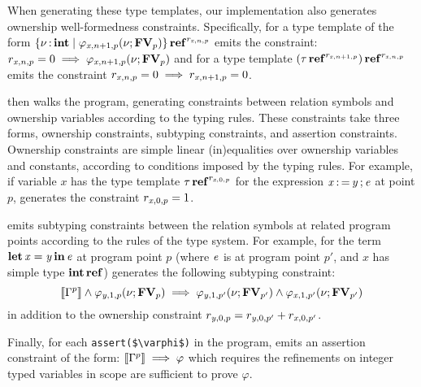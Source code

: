 When generating these type templates, our implementation
also generates ownership well-formedness constraints. Specifically,
for a type template of the form $  \left\{{  \nu  \operatorname{:} \mathbf{int} \mid    \varphi _{ \mathit{x} , n  +  1 , p }  ( \nu ;   \mathbf{FV} _{ p }  )  }\right\}   \operatorname{\mathbf{ref}}^{  r _{ \mathit{x} , n , p }  } $
\name emits the constraint: $ r _{ \mathit{x} , n , p }   =  0  \implies    \varphi _{ \mathit{x} , n  +  1 , p }  ( \nu ;   \mathbf{FV} _{ p }  ) $
and for a type template $ (   \tau  \operatorname{\mathbf{ref}}^{  r _{ \mathit{x} , n  +  1 , p }  }   )  \operatorname{\mathbf{ref}}^{  r _{ \mathit{x} , n , p }  } $
\name emits the constraint $ r _{ \mathit{x} , n , p }   =  0  \implies   r _{ \mathit{x} , n  +  1 , p }   =  0$.

\name then walks the program, generating constraints between
relation symbols and ownership variables according to
the typing rules. These constraints take three forms, ownership
constraints, subtyping constraints, and assertion constraints.
Ownership constraints are simple linear (in)equalities over ownership variables
and constants, according to conditions imposed by the typing
rules. For example, if variable $\mathit{x}$ has the type template
$ \tau  \operatorname{\mathbf{ref}}^{  r _{ \mathit{x} , 0 , p }  } $ for the expression $ \mathit{x}  \operatorname{:=}  \mathit{y}  \operatorname{;}  \mathit{e} $ at point
$p$, \name generates the constraint $ r _{ \mathit{x} , 0 , p }   =  1$.

\name emits subtyping constraints between the relation symbols
at related program points according to the rules of the type system.
For example, for the term $ \operatorname{\mathbf{let}}  \mathit{x}  =  \mathit{y}  \operatorname{\mathbf{in}}  \mathit{e} $
at program point $p$ (where $\mathit{e}$ is at program point $p'$, and $\mathit{x}$ has simple type
$  \mathbf{int}   \operatorname{\mathbf{ref}} $) \name generates the following subtyping constraint:
\[
   \left\llbracket{  \Gamma ^ p  }\right\rrbracket   \wedge    \varphi _{ \mathit{y} , 1 , p }  ( \nu ;   \mathbf{FV} _{ p }  )   \implies    \varphi _{ \mathit{y} , 1 , p' }  ( \nu ;   \mathbf{FV} _{ p' }  )   \wedge    \varphi _{ \mathit{x} , 1 , p' }  ( \nu ;   \mathbf{FV} _{ p' }  ) 
\]
in addition to the ownership constraint $ r _{ \mathit{y} , 0 , p }   =    r _{ \mathit{y} , 0 , p' }   +  r _{ \mathit{x} , 0 , p' } $.

Finally, for each \lstinline[mathescape]{assert($\varphi$)} in the program, \name emits an assertion
constraint of the form: $ \left\llbracket{  \Gamma ^ p  }\right\rrbracket   \implies  \varphi$
which requires the refinements on integer typed variables
in scope are sufficient to prove $\varphi$.

